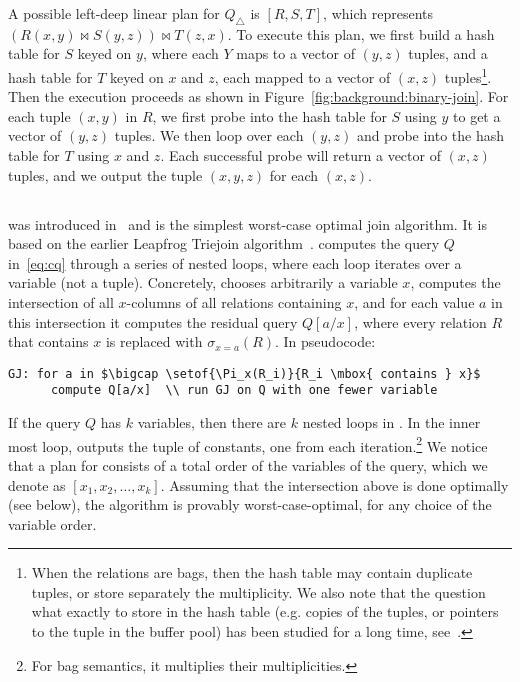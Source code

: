 \begin{ex}
  A possible left-deep linear plan for $Q_\triangle$ is $[R, S, T]$,
  which represents $(R(x,y) \Join S(y,z)) \Join T(z,x)$.  To execute
  this plan, we first build a hash table for $S$ keyed on $y$, where
  each $Y$ maps to a vector of $(y,z)$ tuples, 
  and a hash table for $T$ keyed on $x$ and $z$, each mapped to a
  vector of $(x,z)$ tuples\footnote{When the relations are bags, then
    the hash table may contain duplicate tuples, or store separately
    the multiplicity.  We also note that the question what exactly to
    store in the hash table (e.g. copies of the tuples, or pointers to
    the tuple in the buffer pool) has been studied for a long time,
    see~\cite{DBLP:journals/csur/Graefe93}.}.  Then the execution
  proceeds as shown in Figure~\ref{fig:background:binary-join}.  For each
  tuple $(x, y)$ in $R$, we first probe into the hash table for $S$
  using $y$ to get a vector of $(y, z)$ tuples.  We then loop over
  each $(y, z)$ and probe into the hash table for $T$ using $x$ and
  $z$.  Each successful probe will return a vector of $(x, z)$ tuples,
  and we output the tuple $(x, y, z)$ for each $(x, z)$.
\end{ex}

\subsection{\GJ}\label{sec:background:gj}

\GJ was introduced in~\cite{DBLP:journals/sigmod/NgoRR13} and is the
simplest worst-case optimal join algorithm.  It is based on the
earlier Leapfrog Triejoin algorithm~\cite{DBLP:conf/icdt/Veldhuizen14}.
%
\GJ computes the query $Q$ in~\eqref{eq:cq} through a series of nested
loops, where each loop iterates over a variable (not a tuple).
Concretely, \GJ chooses arbitrarily a variable $x$, computes the
intersection of all $x$-columns of all relations containing $x$, and
for each value $a$ in this intersection it computes the residual query
$Q[a/x]$, where every relation $R$ that contains $x$ is replaced with
$\sigma_{x=a}(R)$.  In pseudocode:
%
\begin{lstlisting}
GJ: for a in $\bigcap \setof{\Pi_x(R_i)}{R_i \mbox{ contains } x}$
      compute Q[a/x]  \\ run GJ on Q with one fewer variable
\end{lstlisting}
%
If the query $Q$ has $k$ variables, then there are $k$ nested loops in
\GJ.  In the inner most loop, \GJ outputs the tuple of constants, one
from each iteration.\footnote{For bag semantics, it multiplies their
  multiplicities.}  We notice that a plan for \GJ consists of a total
order of the variables of the query, which we denote as
$[x_1, x_2, \ldots, x_k]$.  Assuming that the intersection above is
done optimally (see below), the algorithm is provably
worst-case-optimal, for any choice of the variable order.

